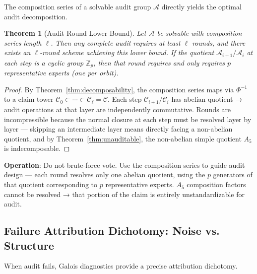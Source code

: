 \documentclass[10pt,a4paper]{article}
\newtheorem{theorem}{Theorem}[section]
\theoremstyle{remark}
\begin{document}
The composition series of a solvable audit group $\mathcal{A}$ directly yields the optimal audit decomposition.

\begin{theorem}[Audit Round Lower Bound]
Let $\mathcal{A}$ be solvable with composition series length $\ell$. Then any complete audit requires at least $\ell$ rounds, and there exists an $\ell$-round scheme achieving this lower bound. If the quotient $\mathcal{A}_{i+1}/\mathcal{A}_i$ at each step is a cyclic group $\mathbb{Z}_p$, then that round requires and only requires $p$ representative experts (one per orbit).
\end{theorem}

\begin{proof}
By Theorem~\ref{thm:decomposability}, the composition series maps via $\Phi^{-1}$ to a claim tower $\mathcal{C}_0 \subset \cdots \subset \mathcal{C}_\ell = \mathcal{C}$. Each step $\mathcal{C}_{i+1}/\mathcal{C}_i$ has abelian quotient → audit operations at that layer are independently commutative. Rounds are incompressible because the normal closure at each step must be resolved layer by layer — skipping an intermediate layer means directly facing a non-abelian quotient, and by Theorem~\ref{thm:unauditable}, the non-abelian simple quotient $A_5$ is indecomposable.
\end{proof}

\textbf{Operation}: Do not brute-force vote. Use the composition series to guide audit design — each round resolves only one abelian quotient, using the $p$ generators of that quotient corresponding to $p$ representative experts. $A_5$ composition factors cannot be resolved → that portion of the claim is entirely unstandardizable for audit.

\subsection{Failure Attribution Dichotomy: Noise vs. Structure}

When audit fails, Galois diagnostics provide a precise attribution dichotomy.
\end{document}
